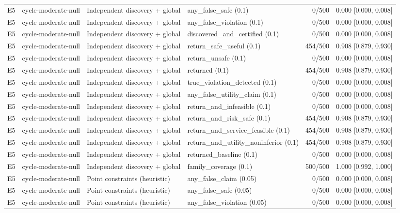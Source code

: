\begin{longtable}{p{.04\linewidth}p{.18\linewidth}p{.19\linewidth}p{.16\linewidth}r p{.21\linewidth}}
E5 & cycle-moderate-null & Independent discovery + global & any\_false\_safe (0.1) & 0/500 & 0.000 [0.000, 0.008]\\
E5 & cycle-moderate-null & Independent discovery + global & any\_false\_violation (0.1) & 0/500 & 0.000 [0.000, 0.008]\\
E5 & cycle-moderate-null & Independent discovery + global & discovered\_and\_certified (0.1) & 0/500 & 0.000 [0.000, 0.008]\\
E5 & cycle-moderate-null & Independent discovery + global & return\_safe\_useful (0.1) & 454/500 & 0.908 [0.879, 0.930]\\
E5 & cycle-moderate-null & Independent discovery + global & return\_unsafe (0.1) & 0/500 & 0.000 [0.000, 0.008]\\
E5 & cycle-moderate-null & Independent discovery + global & returned (0.1) & 454/500 & 0.908 [0.879, 0.930]\\
E5 & cycle-moderate-null & Independent discovery + global & true\_violation\_detected (0.1) & 0/500 & 0.000 [0.000, 0.008]\\
E5 & cycle-moderate-null & Independent discovery + global & any\_false\_utility\_claim (0.1) & 0/500 & 0.000 [0.000, 0.008]\\
E5 & cycle-moderate-null & Independent discovery + global & return\_and\_infeasible (0.1) & 0/500 & 0.000 [0.000, 0.008]\\
E5 & cycle-moderate-null & Independent discovery + global & return\_and\_risk\_safe (0.1) & 454/500 & 0.908 [0.879, 0.930]\\
E5 & cycle-moderate-null & Independent discovery + global & return\_and\_service\_feasible (0.1) & 454/500 & 0.908 [0.879, 0.930]\\
E5 & cycle-moderate-null & Independent discovery + global & return\_and\_utility\_noninferior (0.1) & 454/500 & 0.908 [0.879, 0.930]\\
E5 & cycle-moderate-null & Independent discovery + global & returned\_baseline (0.1) & 0/500 & 0.000 [0.000, 0.008]\\
E5 & cycle-moderate-null & Independent discovery + global & family\_coverage (0.1) & 500/500 & 1.000 [0.992, 1.000]\\
E5 & cycle-moderate-null & Point constraints (heuristic) & any\_false\_claim (0.05) & 0/500 & 0.000 [0.000, 0.008]\\
E5 & cycle-moderate-null & Point constraints (heuristic) & any\_false\_safe (0.05) & 0/500 & 0.000 [0.000, 0.008]\\
E5 & cycle-moderate-null & Point constraints (heuristic) & any\_false\_violation (0.05) & 0/500 & 0.000 [0.000, 0.008]\\

\end{longtable}
